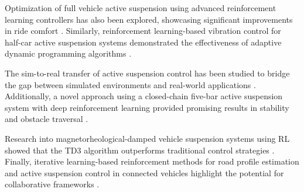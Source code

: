 	Optimization of full vehicle active suspension using advanced reinforcement learning controllers has also been explored, showcasing significant improvements in ride comfort \cite{ai_rl_full_vehicle}. Similarly, reinforcement learning-based vibration control for half-car active suspension systems demonstrated the effectiveness of adaptive dynamic programming algorithms \cite{rl_half_car}.
	
	The sim-to-real transfer of active suspension control has been studied to bridge the gap between simulated environments and real-world applications \cite{sim_to_real_rl}. Additionally, a novel approach using a closed-chain five-bar active suspension system with deep reinforcement learning provided promising results in stability and obstacle traversal \cite{closed_chain_rl}.
	
	Research into magnetorheological-damped vehicle suspension systems using RL showed that the TD3 algorithm outperforms traditional control strategies \cite{mr_damped_rl}. Finally, iterative learning-based reinforcement methods for road profile estimation and active suspension control in connected vehicles highlight the potential for collaborative frameworks \cite{iterative_learning_rl}.
	


	